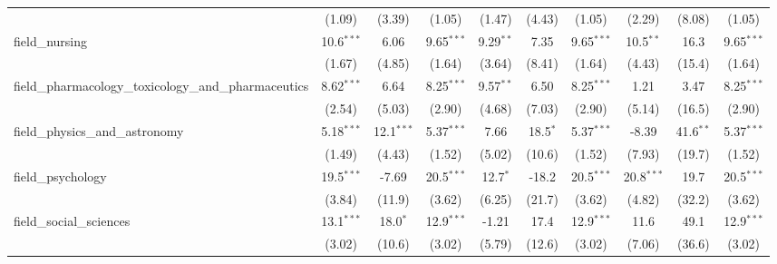 \begin{tabular}{lccccccccc}
                                                               & (1.09)        & (3.39)         & (1.05)        & (1.47)        & (4.43)        & (1.05)        & (2.29)        & (8.08)         & (1.05)\\   
   field\_nursing                                              & 10.6$^{***}$  & 6.06           & 9.65$^{***}$  & 9.29$^{**}$   & 7.35          & 9.65$^{***}$  & 10.5$^{**}$   & 16.3           & 9.65$^{***}$\\   
                                                               & (1.67)        & (4.85)         & (1.64)        & (3.64)        & (8.41)        & (1.64)        & (4.43)        & (15.4)         & (1.64)\\   
   field\_pharmacology\_toxicology\_and\_pharmaceutics         & 8.62$^{***}$  & 6.64           & 8.25$^{***}$  & 9.57$^{**}$   & 6.50          & 8.25$^{***}$  & 1.21          & 3.47           & 8.25$^{***}$\\   
                                                               & (2.54)        & (5.03)         & (2.90)        & (4.68)        & (7.03)        & (2.90)        & (5.14)        & (16.5)         & (2.90)\\   
   field\_physics\_and\_astronomy                              & 5.18$^{***}$  & 12.1$^{***}$   & 5.37$^{***}$  & 7.66          & 18.5$^{*}$    & 5.37$^{***}$  & -8.39         & 41.6$^{**}$    & 5.37$^{***}$\\   
                                                               & (1.49)        & (4.43)         & (1.52)        & (5.02)        & (10.6)        & (1.52)        & (7.93)        & (19.7)         & (1.52)\\   
   field\_psychology                                           & 19.5$^{***}$  & -7.69          & 20.5$^{***}$  & 12.7$^{*}$    & -18.2         & 20.5$^{***}$  & 20.8$^{***}$  & 19.7           & 20.5$^{***}$\\   
                                                               & (3.84)        & (11.9)         & (3.62)        & (6.25)        & (21.7)        & (3.62)        & (4.82)        & (32.2)         & (3.62)\\   
   field\_social\_sciences                                     & 13.1$^{***}$  & 18.0$^{*}$     & 12.9$^{***}$  & -1.21         & 17.4          & 12.9$^{***}$  & 11.6          & 49.1           & 12.9$^{***}$\\   
                                                               & (3.02)        & (10.6)         & (3.02)        & (5.79)        & (12.6)        & (3.02)        & (7.06)        & (36.6)         & (3.02)\\   

\end{tabular}
